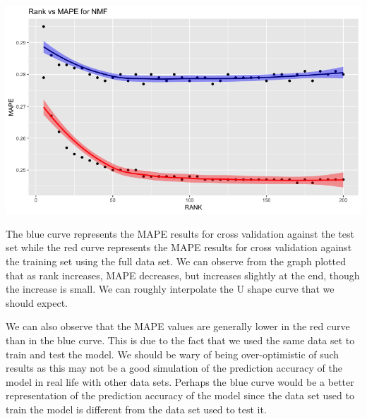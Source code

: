 \documentclass{article}
\begin{document}
\includegraphics[scale=0.4]{RankVSMAPEforNNMF.png}

The blue curve represents the MAPE results for cross validation against the test set while the red curve represents the MAPE results for cross validation against the training set using the full data set. We can observe from the graph plotted that as rank increases, MAPE decreases, but increases slightly at the end, though the increase is small. We can roughly interpolate the U shape curve that we should expect. 

We can also observe that the MAPE values are generally lower in the red curve than in the blue curve. This is due to the fact that we used the same data set to train and test the model. We should be wary of being over-optimistic of such results as this may not be a good simulation of the prediction accuracy of the model in real life with other data sets. Perhaps the blue curve would be a better representation of the prediction accuracy of the model since the data set used to train the model is different from the data set used to test it. 
\end{document}
